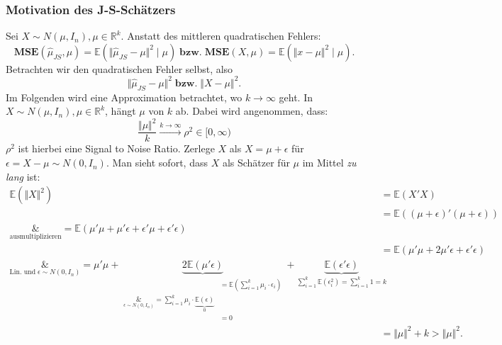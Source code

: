 \documentclass[10pt]{article}
\newcommand{\IR}{\mathbb{R}} %
\newcommand{\EW}{\mathbb{E}} %
\newcommand{\MSE}{\textbf{MSE}} %
\newcommand{\JSEM}{\hat{\mu}_{JS}} %
\begin{document}
	\subsubsection{Motivation des J-S-Schätzers}
	Sei $X \sim N(\mu, I_n), \mu \in \IR^k$. Anstatt des mittleren quadratischen Fehlers:
	\begin{equation*}
		\MSE(\hat{\mu}_{JS}, \mu) = \EW(\Vert \JSEM - \mu \Vert^2 \mid \mu) \; \textbf{bzw.} \; \MSE(X, \mu) = \EW( \Vert x - \mu \Vert^2 \mid \mu).
	\end{equation*}
	Betrachten wir den quadratischen Fehler selbst, also
	\begin{equation*}
		\Vert \JSEM - \mu \Vert^2 \; \textbf{bzw.} \; \Vert X - \mu \Vert^2.
	\end{equation*}
	Im Folgenden wird eine Approximation betrachtet, wo $k \rightarrow \infty$ geht. In $X \sim N(\mu, I_n), \mu \in \IR^k$, hängt $\mu$ von $k$ ab. Dabei wird angenommen, dass:
	\begin{equation*}
		\frac{\Vert \mu \Vert^2}{k} \overset{k \rightarrow \infty}{\longrightarrow} \rho^2 \in [0, \infty) 
	\end{equation*}
	$\rho^2$ ist hierbei eine Signal to Noise Ratio.
	Zerlege $X$ als $X = \mu + \epsilon$ für $\epsilon = X- \mu \sim N(0, I_n)$.
	Man sieht sofort, dass $X$ als Schätzer für $\mu$ im Mittel \textit{zu lang} ist:
	\begin{equation*}
		\begin{split}
			\EW(\Vert X \Vert^2) &= \EW(X'X) \\
			&= \EW((\mu + \epsilon)'(\mu + \epsilon)) \\
			\underset{\text{ausmultiplizieren}}&{=} \EW(\mu' \mu + \mu' \epsilon + \epsilon' \mu + \epsilon' \epsilon) \\
			&= \EW(\mu'\mu + 2\mu'\epsilon + \epsilon'\epsilon)\\
			\underset{\text{Lin. und}\; \epsilon \sim N(0,I_n)}&{=} \mu' \mu + \underbrace{2\EW(\mu'\epsilon)}_{\begin{split}
					&= \EW(\sum_{i=1}^{k} \mu_i \cdot \epsilon_i)\\
					\underset{\epsilon \sim N(0,I_n)}&{=} \sum_{i = 1}^{k} \mu_i \cdot \underbrace{\EW(\epsilon)}_{0}\\
					&=0
				\end{split}} + \underbrace{\EW(\epsilon' \epsilon)}_{\sum_{i=1}^{k}\EW(\epsilon_i^2)= \sum_{i = 1}^{k} 1 = k}\\
			&= \Vert \mu \Vert^2 +k > \Vert \mu \Vert^2.
		\end{split}
	\end{equation*}
	
\end{document}
